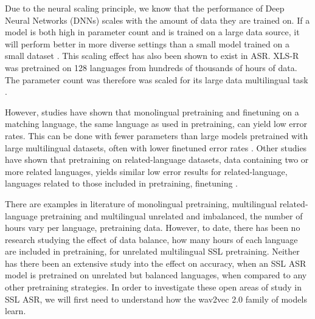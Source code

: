 
Due to the neural scaling principle, we know that the performance of Deep Neural Networks (DNNs) scales with the amount of data they are trained on. If a model is both high in parameter count and is trained on a large data source, it will perform better in more diverse settings than a small model trained on a small dataset \cite{hestness2017deep, kaplan2020scaling}. This scaling effect has also been shown to exist in ASR\cite{zhang2022bigssl, pu21_interspeech}. XLS-R was pretrained on 128 languages from hundreds of thousands of hours of data. The parameter count was therefore  was scaled for its large data multilingual task \cite{babu2021xlsr}.


However, studies have shown that monolingual pretraining and finetuning on a matching language, the same language as used in pretraining, can yield low error rates. This can be done with fewer parameters than large models pretrained with large multilingual datasets, often with lower finetuned error rates \cite{ashihara2023exploration, poncelet2021comparison}. Other studies have shown that pretraining on related-language datasets, data containing two or more related languages, yields similar low error results for related-language, languages related to those included in pretraining, finetuning \cite{zhang2023fast, gupta2021clsril}.

There are examples in literature of monolingual pretraining, multilingual related-language pretraining and multilingual unrelated and imbalanced, the number of hours vary per language, pretraining data. However, to date, there has been no research studying the effect of data balance, how many hours of each language are included in pretraining, for unrelated multilingual SSL pretraining. Neither has there been an extensive study into the effect on accuracy, when an SSL ASR model is pretrained on unrelated but balanced languages, when compared to any other pretraining strategies. In order to investigate these open areas of study in SSL ASR, we will first need to understand how the wav2vec 2.0 family of models learn.

